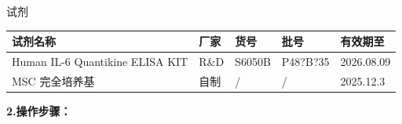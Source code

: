 \documentclass[UTF8,10pt,a4paper,fontset=fandol]{ctexart}
\newcommand{\fieldvalue}[1]{#1}
\newcommand{\handwritten}[1]{#1}
\begin{document}
\medskip
{}\quad 试剂

\begin{center}
\small
\begin{tabular}{|p{5.0cm}|p{2.5cm}|p{2.2cm}|p{3.0cm}|l|}
\hline
试剂名称 & 厂家 & 货号 & 批号 & 有效期至 \\
\hline
Human IL-6 Quantikine ELISA KIT & R\&D & S6050B &
\fieldvalue{\handwritten{P48?B?35}} &
\fieldvalue{\handwritten{2026.08.09}} \\
\hline
MSC 完全培养基 & 自制 & / & / &
\fieldvalue{\handwritten{2025.12.3}} \\
\hline
\end{tabular}
\end{center}

\medskip
\noindent\textbf{2.\quad 操作步骤：}
\end{document}
